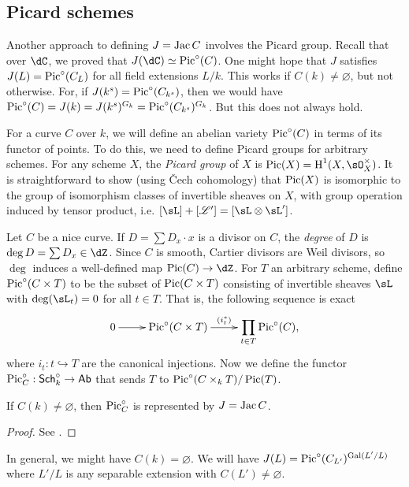 \subsection{Picard schemes}\label{sec:picard-scheme}

Another approach to defining $J=\operatorname{Jac} C$ involves the Picard group. Recall 
that over $\dC$, we proved that $J(\dC)\simeq\picard^\circ(C)$. 
One might hope that $J$ satisfies $J(L)=\operatorname{Pic}^\circ(C_L)$ for all field 
extensions $L/k$. This works if $C(k)\ne\varnothing$, but not otherwise. For, 
if $J(k^s)=\operatorname{Pic}^\circ(C_{k^s})$, then we would have 
$\operatorname{Pic}^\circ(C) = J(k) = J(k^s)^{G_k} = \operatorname{Pic}^\circ(C_{k^s})^{G_k}$. But this 
does not always hold. 

For a curve $C$ over $k$, we will define an abelian variety $\operatorname{Pic}^\circ(C)$ in 
terms of its functor of points. To do this, we need to define Picard groups for 
arbitrary schemes. For any scheme $X$, the \emph{Picard group} of $X$ is 
$\picard(X)=\h^1(X,\sO_X^\times)$. It is straightforward to show (using \v Cech 
cohomology) that $\operatorname{Pic}(X)$ is isomorphic to the group of isomorphism classes of 
invertible sheaves on $X$, with group operation induced by tensor product, i.e. 
$[\sL] + [\mathscr{L'}] = [\sL\otimes \sL']$. 

Let $C$ be a nice curve. If $D=\sum D_x\cdot x$ is a divisor on $C$, the 
\emph{degree} of $D$ is $\deg D=\sum D_x\in \dZ$. Since $C$ is smooth, Cartier 
divisors are Weil divisors, so $\deg$ induces a well-defined map 
$\picard(C)\to \dZ$. For $T$ an arbitrary scheme, define 
$\operatorname{Pic}^\circ(C\times T)$ to be the subset of $\operatorname{Pic}(C\times T)$ consisting of 
invertible sheaves $\sL$ with $\deg(\sL_t)=0$ for all $t\in T$. That is, the 
following sequence is exact 
\[\xymatrix{
  0 \ar[r] 
    & \picard^\circ(C\times T) \ar[r]^-{(i_t^*)}
    & \displaystyle\prod_{t\in T} \picard^\circ (C)\text{,}
}\]
where $i_t:t\hookrightarrow T$ are the canonical injections. Now we define the 
functor $\operatorname{Pic}_C^\circ:\mathsf{Sch}_k^\circ\to\mathsf{Ab}$ that sends $T$ to 
$\operatorname{Pic}^\circ(C\times_k T)/\operatorname{Pic}(T)$. 

\begin{theorem}
If $C(k)\ne \varnothing$, then $\operatorname{Pic}_C^\circ$ is represented by $J=\operatorname{Jac} C$.
\end{theorem}
\begin{proof}
See \cite[III.1.2]{mi-av}.
\end{proof}

In general, we might have $C(k)=\varnothing$. We will have 
$J(L)=\operatorname{Pic}^\circ(C_{L'})^{\operatorname{Gal}(L'/L)}$ where $L'/L$ is any separable extension 
with $C(L')\ne\varnothing$. 

